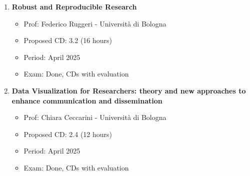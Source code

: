 \documentclass[runningheads]{llncs}
\begin{document}
\begin{enumerate}
        \item \textbf{Robust and Reproducible Research}
        \begin{itemize}
            \item Prof: Federico Ruggeri - Università di Bologna
            \item Proposed CD: 3.2 (16 hours)
            \item Period: April 2025
            \item Exam: Done, CDs with evaluation
        \end{itemize}
        \item \textbf{Data Visualization for Researchers: theory and new approaches to enhance communication and dissemination}
        \begin{itemize}
            \item Prof: Chiara Ceccarini - Università di Bologna
            \item Proposed CD: 2.4 (12 hours)
            \item Period: April 2025
            \item Exam: Done, CDs with evaluation
        \end{itemize}

    \end{enumerate}
%
%
%
    
    
%




\end{document}
